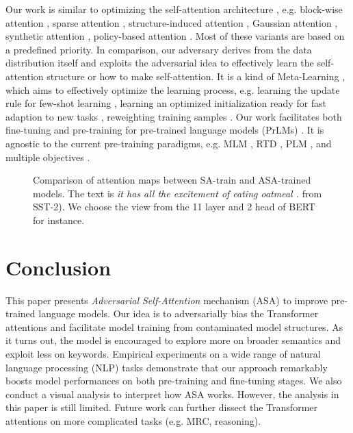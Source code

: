 \documentclass[letterpaper]{article} \usepackage{aaai23}  \usepackage{times}  \usepackage{helvet}  \usepackage{courier}  \usepackage[hyphens]{url}  \usepackage{graphicx} \urlstyle{rm} \def\UrlFont{\rm}  \usepackage{natbib}  \usepackage{caption} \frenchspacing  \setlength{\pdfpagewidth}{8.5in}  \setlength{\pdfpageheight}{11in}  \usepackage{algorithm}
\begin{document}
Our work is similar to optimizing the self-attention architecture \citep{DBLP:conf/nips/VaswaniSPUJGKP17}, e.g. block-wise attention \citep{DBLP:conf/nips/ZaheerGDAAOPRWY20}, sparse attention \citep{DBLP:conf/icml/ShiGRXLLK21}, structure-induced attention \citep{DBLP:conf/acl/WuZZ21}, Gaussian attention \citep{DBLP:conf/acl/YouSI20}, synthetic attention \citep{DBLP:conf/icml/TayBMJZZ21}, policy-based attention \citep{DBLP:journals/corr/abs-2104-04692}. Most of these variants are based on a predefined priority. In comparison, our adversary derives from the data distribution itself and exploits the adversarial idea to effectively learn the self-attention structure or how to make self-attention. It is a kind of Meta-Learning \citep{DBLP:books/sp/98/ThrunP98}, which aims to effectively optimize the learning process, e.g. learning the update rule for few-shot learning \citep{DBLP:conf/iclr/RaviL17}, learning an optimized initialization ready for fast adaption to new tasks \citep{DBLP:conf/icml/FinnAL17}, reweighting training samples \citep{DBLP:conf/icml/RenZYU18}. Our work facilitates both fine-tuning and pre-training for pre-trained language models (PrLMs) \citep{DBLP:conf/naacl/DevlinCLT19,DBLP:journals/corr/abs-1907-11692,DBLP:journals/jmlr/RaffelSRLNMZLL20,DBLP:conf/iclr/HeLGC21}. It is agnostic to the current pre-training paradigms, e.g. MLM \citep{DBLP:conf/naacl/DevlinCLT19}, RTD \citep{DBLP:conf/iclr/ClarkLLM20}, PLM \citep{DBLP:conf/nips/YangDYCSL19}, and multiple objectives \citep{DBLP:journals/corr/abs-2210-10293}.

\begin{figure}
\centering
{}
\caption{Comparison of attention maps between SA-train and ASA-trained models. The text is \textit{it has all the excitement of eating oatmeal .} from SST-2). We choose the view from the 11 layer and 2 head of BERT for instance.}
\label{f10}
\end{figure}


\section{Conclusion}

This paper presents \textit{Adversarial Self-Attention} mechanism (ASA) to improve pre-trained language models. Our idea is to adversarially bias the Transformer attentions and facilitate model training from contaminated model structures. As it turns out, the model is encouraged to explore more on broader semantics and exploit less on keywords. Empirical experiments on a wide range of natural language processing (NLP) tasks demonstrate that our approach remarkably boosts model performances on both pre-training and fine-tuning stages. We also conduct a visual analysis to interpret how ASA works. However, the analysis in this paper is still limited. Future work can further dissect the Transformer attentions on more complicated tasks (e.g. MRC, reasoning).
\end{document}
